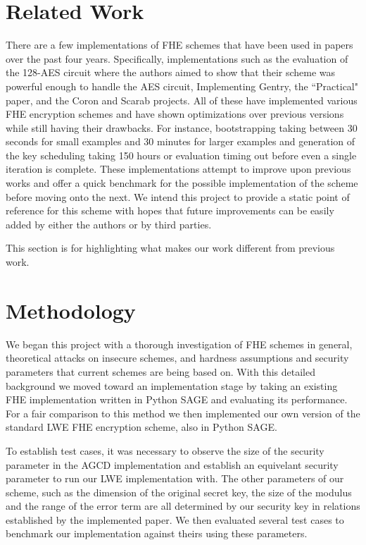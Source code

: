 \documentclass[letterpaper,twocolumn,10pt]{article}
\begin{document}
\section{Related Work}
There are a few implementations of FHE schemes that have been used in papers over the past four years. Specifically, implementations such as the evaluation of the 128-AES circuit\cite{AES} where the authors aimed to show that their scheme was powerful enough to handle the AES circuit, Implementing Gentry\cite{ImplementingGentry}, the ``Practical" paper\cite{Practical}, and the Coron and Scarab projects. All of these have implemented various FHE encryption schemes and have shown optimizations over previous versions while still having their drawbacks. For instance, bootstrapping taking between 30 seconds for small examples and 30 minutes for larger examples\cite{ImplementingGentry} and generation of the key scheduling taking 150 hours or evaluation timing out before even a single iteration is complete\cite{AES}. These implementations attempt to improve upon previous works and offer a quick benchmark for the possible implementation of the scheme before moving onto the next. We intend this project to provide a static point of reference for this scheme with hopes that future improvements can be easily added by either the authors or by third parties.

This section is for highlighting what makes our work different from previous work.


\section{Methodology}

We began this project with a thorough investigation of FHE schemes in general, theoretical attacks on insecure schemes, and hardness assumptions and security parameters that current schemes are being based on. With this detailed background we moved toward an implementation stage by taking an existing FHE implementation written in Python SAGE and evaluating its performance. For a fair comparison to this method we then implemented our own version of the standard LWE FHE encryption scheme, also in Python SAGE.

To establish test cases, it was necessary to observe the size of the security parameter in the AGCD implementation and establish an equivelant security parameter to run our LWE implementation with. The other parameters of our scheme, such as the dimension of the original secret key, the size of the modulus and the range of the error term are all determined by our security key in relations established by the implemented paper\cite{NEEDED}. We then evaluated several test cases to benchmark our implementation against theirs using these parameters.
\end{document}

